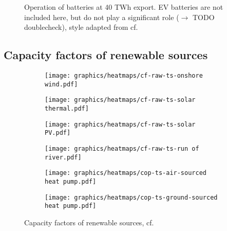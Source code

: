 \begin{figure}
    \caption{Operation of batteries at 40 TWh export. EV batteries are not included here, but do not play a significant role ($\rightarrow$ TODO doublecheck), style adapted from cf. \cite{Neumann2022}}
    \label{fig:battery_operation}
\end{figure}

\clearpage
\twocolumn



\subsection{Capacity factors of renewable sources}

\clearpage
\onecolumn
\begin{figure}
    \centering
        \begin{subfigure}[t]{0.49\textwidth}
            \centering
        \texttt{[image: graphics/heatmaps/cf-raw-ts-onshore wind.pdf]}
    \end{subfigure}
    \begin{subfigure}[t]{0.49\textwidth}
        \centering
        \texttt{[image: graphics/heatmaps/cf-raw-ts-solar thermal.pdf]}
    \end{subfigure}
    \begin{subfigure}[t]{0.49\textwidth}
        \centering
        \texttt{[image: graphics/heatmaps/cf-raw-ts-solar PV.pdf]}
    \end{subfigure}
    \begin{subfigure}[t]{0.49\textwidth}
        \centering
        \texttt{[image: graphics/heatmaps/cf-raw-ts-run of river.pdf]}
    \end{subfigure}
    \begin{subfigure}[t]{0.49\textwidth}
        \centering
        \texttt{[image: graphics/heatmaps/cop-ts-air-sourced heat pump.pdf]}
    \end{subfigure}
    \begin{subfigure}[t]{0.49\textwidth}
        \centering
        \texttt{[image: graphics/heatmaps/cop-ts-ground-sourced heat pump.pdf]}
    \end{subfigure}
    \caption{Capacity factors of renewable sources, cf. \cite{Neumann2022}}
    \label{fig:ren-cfs}
\end{figure}
\clearpage
\twocolumn









